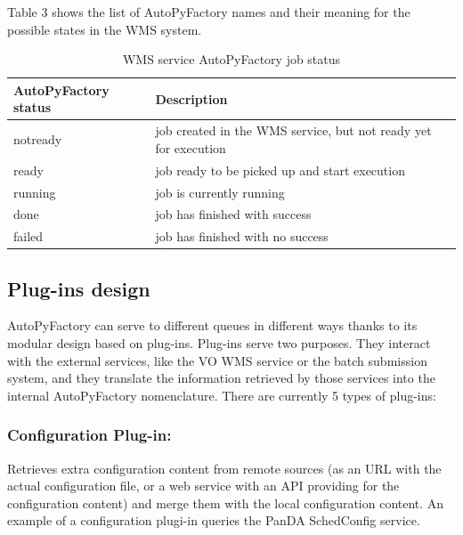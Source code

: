 \documentclass[a4paper]{jpconf}
\begin{document}
Table 3 shows the list of AutoPyFactory names and their meaning 
for the possible states in the WMS system.

\begin{table}
   \begin{center}
      \begin{tabular}{l l}
         \hline
         \textbf{AutoPyFactory status} & \textbf{Description} \\
         \hline
         notready &     job created in the WMS service, but not ready yet for execution\\ 
         ready    &     job ready to be picked up and start execution                  \\ 
         running  &     job is currently running                                       \\ 
         done     &     job has finished with success                                  \\ 
         failed   &     job has finished with no success                               \\ 
         \hline
      \end{tabular}
   \end{center}
   \caption{WMS service AutoPyFactory job status}
   \label{wms job status}
\end{table}

\subsection{Plug-ins design}

AutoPyFactory can serve to different queues in different ways 
thanks to its modular design based on plug-ins. 
Plug-ins serve two purposes. 
They interact with the external services, like the VO WMS service or the batch submission system,
and they translate the information retrieved by those services into the internal AutoPyFactory nomenclature.
There are currently 5 types of plug-ins:


\subsubsection{Configuration Plug-in:}

Retrieves extra configuration content from remote sources 
(as an URL with the actual configuration file, or a web service with an API providing for the configuration content)
and merge them with the local configuration content.
An example of a configuration plugi-in queries the PanDA SchedConfig service.
\end{document}
